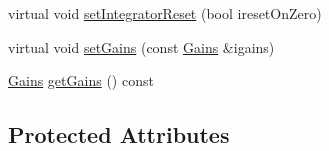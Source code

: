 \begin{DoxyCompactItemize}
\item 
virtual void \mbox{\hyperlink{classokapi_1_1IterativePosPIDController_afa74b0883996ed60c5d7b0090c1acae1}{set\+Integrator\+Reset}} (bool ireset\+On\+Zero)
\item 
virtual void \mbox{\hyperlink{classokapi_1_1IterativePosPIDController_ae42e06f7c23ddff49cc2576f8417ce00}{set\+Gains}} (const \mbox{\hyperlink{structokapi_1_1IterativePosPIDController_1_1Gains}{Gains}} \&igains)
\item 
\mbox{\hyperlink{structokapi_1_1IterativePosPIDController_1_1Gains}{Gains}} \mbox{\hyperlink{classokapi_1_1IterativePosPIDController_ad441fc988ded8fc2599b2c719fbcabe7}{get\+Gains}} () const
\end{DoxyCompactItemize}
\subsection*{Protected Attributes}
